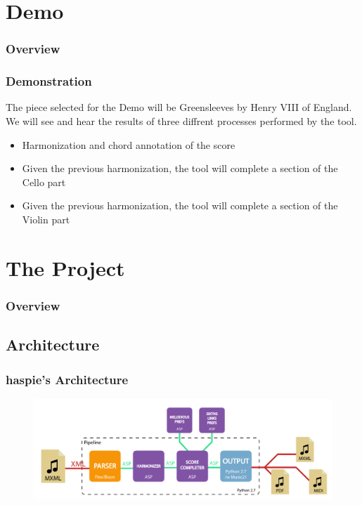 \documentclass[english]{beamer}
\begin{document}
\section{Demo}
\begin{frame}
	\frametitle{Overview}
\end{frame}
	\begin{frame}
		\frametitle{Demonstration}
		The piece selected for the Demo will be Greensleeves by Henry VIII of England. We will see and hear the results of three diffrent processes performed by the tool.
		\begin{itemize}
			\item Harmonization and chord annotation of the score
			\item Given the previous harmonization, the tool will complete a section of the Cello part
			\item Given the previous harmonization, the tool will complete a section of the Violin part
		\end{itemize}
	\end{frame}

\section{The Project}
\begin{frame}
	\frametitle{Overview}
\end{frame}
\subsection{Architecture}
	\begin{frame}
		\frametitle{haspie's Architecture}
		\begin{figure}
		\centering
		\includegraphics[width=\linewidth]{imagenes/arquitectura_final.pdf}
		\end{figure}
	\end{frame}
\end{document}
